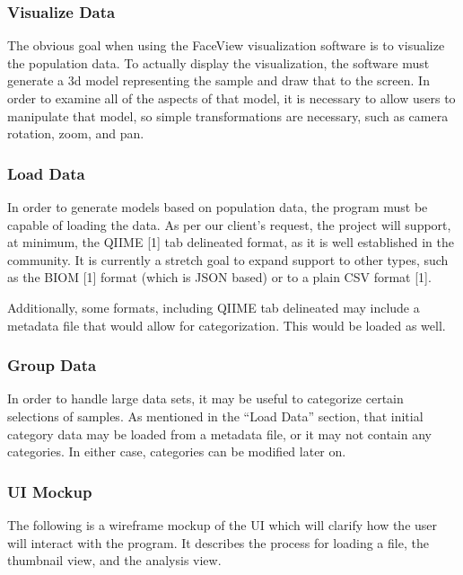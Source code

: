 \documentclass[letterpaper,10pt, onecolumn, draftclsnofoot]{IEEEtran}
\begin{document}
\subsubsection{Visualize Data}
The obvious goal when using the FaceView visualization software is to visualize the population data. To actually display the visualization, the software must generate a 3d model representing the sample and draw that to the screen. In order to examine all of the aspects of that model, it is necessary to allow users to manipulate that model, so simple transformations are necessary, such as camera rotation, zoom, and pan.

\subsubsection{Load Data}
In order to generate models based on population data, the program must be capable of loading the data. As per our client's request, the project will support, at minimum, the QIIME [1] tab delineated format, as it is well established in the community. It is currently a stretch goal to expand support to other types, such as the BIOM [1] format (which is JSON based) or to a plain CSV format [1].

Additionally, some formats, including QIIME tab delineated may include a metadata file that would allow for categorization. This would be loaded as well.
\subsubsection{Group Data}
In order to handle large data sets, it may be useful to categorize certain selections of samples. As mentioned in the ``Load Data'' section, that initial category data may be loaded from a metadata file, or it may not contain any categories. In either case, categories can be modified later on.

\subsubsection{UI Mockup}
The following is a wireframe mockup of the UI which will clarify how the user will interact with the program. It describes the process for loading a file, the thumbnail view, and the analysis view.
\end{document}
